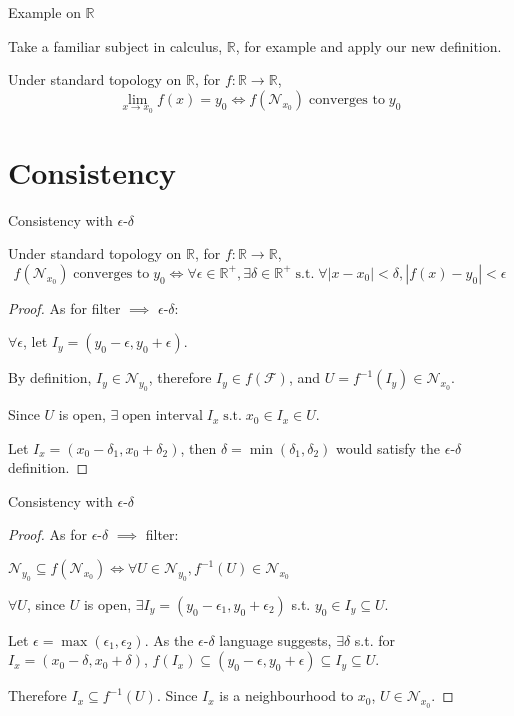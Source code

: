 \documentclass[aspectratio=169]{beamer}
\newcommand{\R}{\mathbb{R}}
\newcommand{\msg}[1]{\; \text{#1} \;}
\newcommand{\st}{\msg{s.t.}}
\begin{document}
	\begin{frame}{Example on $\R$}
		
		Take a familiar subject in calculus, $\R$, for example and apply our new definition.
		
		\begin{definition}[Limit on $\R$]
			Under standard topology on $\R$, for $f: \R \to \R$,
			$$
			\lim_{x \to x_0} f(x) = y_0
			\iff f(\mathcal N_{x_0}) \msg{converges to} y_0
			$$
		\end{definition}
	\end{frame}

	\section{Consistency}
	
	\begin{frame}{Consistency with $\epsilon$-$\delta$}
		\begin{theorem}
		Under standard topology on $\R$, for $f: \R \to \R$,
		$$
		f(\mathcal N_{x_0}) \msg{converges to} y_0
		\iff \forall \epsilon \in \mathbb R^+, \exists \delta \in \mathbb R^+ \st
		\forall \left| x-x_0 \right| < \delta, \left| f(x) - y_0 \right| < \epsilon
		$$
		\end{theorem}
		\begin{proof}
			As for filter $\implies$ $\epsilon$-$\delta$:
			
			$\forall \epsilon$, let $I_y = (y_0 - \epsilon, y_0 + \epsilon)$.
			
			By definition, $I_y \in \mathcal N_{y_0}$, therefore $I_y \in f(\mathcal F)$, and $U = f^{-1}(I_y) \in \mathcal N_{x_0}$.
			
			Since $U$ is open, $\exists \msg{open interval} I_x \st x_0 \in I_x \in U$.
			
			Let $I_x = (x_0 - \delta_1, x_0 + \delta_2)$, then $\delta = \min(\delta_1, \delta_2)$ would satisfy the $\epsilon$-$\delta$ definition.
		\end{proof}
	\end{frame}
	
	\begin{frame}{Consistency with $\epsilon$-$\delta$}
		\begin{proof}
			As for $\epsilon$-$\delta$ $\implies$ filter:
			
			$\mathcal N_{y_0} \subseteq f(\mathcal N_{x_0}) \iff \forall U \in \mathcal N_{y_0}, f^{-1}(U) \in \mathcal N_{x_0}$
			
			$\forall U$, since $U$ is open, $\exists I_y = (y_0 - \epsilon_1, y_0 + \epsilon_2)$ s.t. $y_0 \in I_y \subseteq U$.
			
			Let $\epsilon = \max(\epsilon_1, \epsilon_2)$. As the $\epsilon$-$\delta$ language suggests, $\exists \delta$ s.t. for $I_x = (x_0 - \delta, x_0 + \delta)$, $f(I_x) \subseteq (y_0 - \epsilon, y_0 + \epsilon) \subseteq I_y \subseteq U$.
			
			Therefore $I_x \subseteq f^{-1}(U)$. Since $I_x$ is a neighbourhood to $x_0$, $U \in \mathcal N_{x_0}$.
		\end{proof}
	\end{frame}
\end{document}
